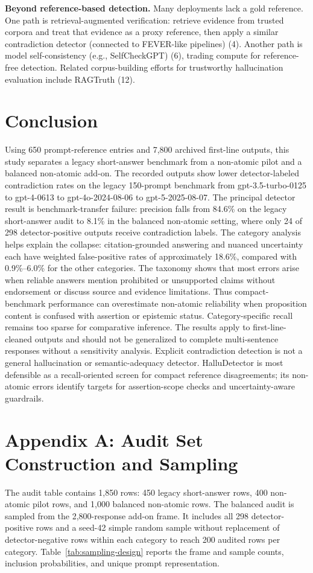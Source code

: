 \documentclass[11pt]{article}
\begin{document}
\textbf{Beyond reference-based detection.} Many deployments lack a gold reference. One path is retrieval-augmented verification: retrieve evidence from trusted corpora and treat that evidence as a proxy reference, then apply a similar contradiction detector (connected to FEVER-like pipelines) (4). Another path is model self-consistency (e.g., SelfCheckGPT) (6), trading compute for reference-free detection. Related corpus-building efforts for trustworthy hallucination evaluation include RAGTruth (12).


\section*{Conclusion}
Using 650 prompt-reference entries and 7,800 archived first-line outputs, this study separates a legacy short-answer benchmark from a non-atomic pilot and a balanced non-atomic add-on. The recorded outputs show lower detector-labeled contradiction rates on the legacy 150-prompt benchmark from gpt-3.5-turbo-0125 to gpt-4-0613 to gpt-4o-2024-08-06 to gpt-5-2025-08-07. The principal detector result is benchmark-transfer failure: precision falls from 84.6\% on the legacy short-answer audit to 8.1\% in the balanced non-atomic setting, where only 24 of 298 detector-positive outputs receive contradiction labels. The category analysis helps explain the collapse: citation-grounded answering and nuanced uncertainty each have weighted false-positive rates of approximately 18.6\%, compared with 0.9\%--6.0\% for the other categories. The taxonomy shows that most errors arise when reliable answers mention prohibited or unsupported claims without endorsement or discuss source and evidence limitations. Thus compact-benchmark performance can overestimate non-atomic reliability when proposition content is confused with assertion or epistemic status. Category-specific recall remains too sparse for comparative inference. The results apply to first-line-cleaned outputs and should not be generalized to complete multi-sentence responses without a sensitivity analysis. Explicit contradiction detection is not a general hallucination or semantic-adequacy detector. HalluDetector is most defensible as a recall-oriented screen for compact reference disagreements; its non-atomic errors identify targets for assertion-scope checks and uncertainty-aware guardrails.

\section*{Appendix A: Audit Set Construction and Sampling}
The audit table contains 1,850 rows: 450 legacy short-answer rows, 400 non-atomic pilot rows, and 1,000 balanced non-atomic rows. The balanced audit is sampled from the 2,800-response add-on frame. It includes all 298 detector-positive rows and a seed-42 simple random sample without replacement of detector-negative rows within each category to reach 200 audited rows per category. Table~\ref{tab:sampling-design} reports the frame and sample counts, inclusion probabilities, and unique prompt representation.
\end{document}
